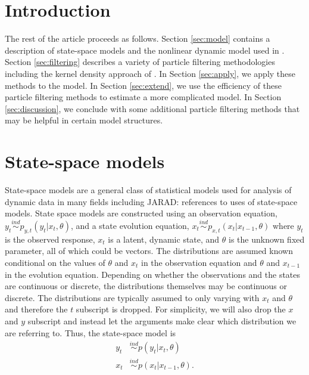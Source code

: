 \documentclass{article}
\newcommand{\jarad}[1]{{\color{red}JARAD: #1}}
\begin{document}
\section{Introduction}

The rest of the article proceeds as follows. Section \ref{sec:model} contains a description of state-space models and the nonlinear dynamic model used in \citet{skvortsov2012monitoring}. Section \ref{sec:filtering} describes a variety of particle filtering methodologies including the kernel density approach of \cite{Liu:West:comb:2001}. In Section \ref{sec:apply}, we apply these methods to the \citet{skvortsov2012monitoring} model. In Section \ref{sec:extend}, we use the efficiency of these particle filtering methods to estimate a more complicated model. In Section \ref{sec:discussion}, we conclude with some additional particle filtering methods that may be helpful in certain model structures.

\section{State-space models \label{sec:model}}

State-space models are a general class of statistical models used for analysis of dynamic data in many fields including \jarad{references to uses of state-space models}. State space models are constructed using an observation equation, $y_t \stackrel{ind}{\sim} p_{y,t}(y_t|x_t,\theta)$, and a state evolution equation, $x_t \stackrel{ind}{\sim} p_{x,t}(x_t|x_{t-1},\theta)$ where $y_t$ is the observed response, $x_t$ is a latent, dynamic state, and $\theta$ is the unknown fixed parameter, all of which could be vectors. The distributions are assumed known conditional on the values of $\theta$ and $x_t$ in the observation equation and $\theta$ and $x_{t-1}$ in the evolution equation. Depending on whether the observations and the states are continuous or discrete, the distributions themselves may be continuous or discrete. The distributions are typically assumed to only varying with $x_t$ and $\theta$ and therefore the $t$ subscript is dropped.
For simplicity, we will also drop the $x$ and $y$ subscript and instead let the arguments make clear which distribution we are referring to. Thus, the state-space model is
\begin{align*}
y_t &\stackrel{ind}{\sim} p(y_t|x_t,\theta) \\
x_t &\stackrel{ind}{\sim} p(x_t|x_{t-1},\theta).
\end{align*}
\end{document}
